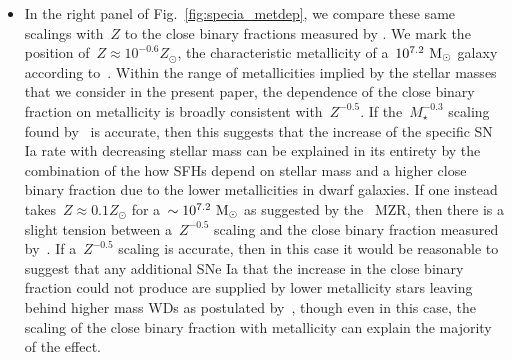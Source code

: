 \documentclass[ms.tex]{subfiles}
\begin{document}
\begin{itemize}
	\item In the right panel of Fig.~\ref{fig:specia_metdep}, we compare these
	same scalings with~$Z$ to the close binary fractions measured by
	\citet{Moe2019}.
	We mark the position of~$Z \approx 10^{-0.6} Z_\odot$, the characteristic
	metallicity of a~$10^{7.2}~\text{M}_\odot$ galaxy according to~\citet{Zahid2014}.
	Within the range of metallicities implied by the stellar masses that we
	consider in the present paper, the dependence of the close binary fraction
	on metallicity is broadly consistent with~$Z^{-0.5}$.
	If the~$M_\star^{-0.3}$ scaling found by~\citet{Gandhi2022} is accurate,
	then this suggests that the increase of the specific SN Ia rate with
	decreasing stellar mass can be explained in its entirety by the combination
	of the how SFHs depend on stellar mass and a higher close binary fraction
	due to the lower metallicities in dwarf galaxies.
	If one instead takes~$Z \approx 0.1 Z_\odot$ for a~$\sim10^{7.2}~\text{M}_\odot$
	as suggested by the~\citet{Andrews2013} MZR, then there is a slight
	tension between a~$Z^{-0.5}$ scaling and the close binary fraction measured
	by~\citet{Moe2019}.
	If a~$Z^{-0.5}$ scaling is accurate, then in this case it would be
	reasonable to suggest that any additional SNe Ia that the increase in the
	close binary fraction could not produce are supplied by lower metallicity
	stars leaving behind higher mass WDs as postulated by~\citet{Kistler2013},
	though even in this case, the scaling of the close binary fraction with
	metallicity can explain the majority of the effect.


\end{itemize}
\end{document}
